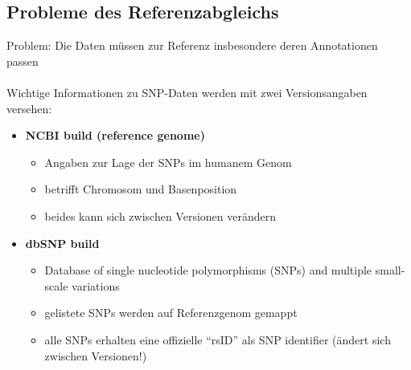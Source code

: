 \subsection{Probleme des Referenzabgleichs}
Problem: Die Daten müssen zur Referenz insbesondere deren Annotationen passen\\\\
Wichtige Informationen zu SNP-Daten werden mit zwei Versionsangaben versehen:
\begin{itemize}
	\item \textbf{NCBI build (reference genome)}
	\begin{itemize}
		\item Angaben zur Lage der SNPs im humanem Genom
		\item betrifft Chromosom und Basenposition
		\item beides kann sich zwischen Versionen verändern
	\end{itemize}
	\item \textbf{dbSNP build}
	\begin{itemize}
		\item Database of single nucleotide polymorphisms (SNPs) and	multiple small-scale variations
		\item gelistete SNPs werden auf Referenzgenom gemappt
		\item alle SNPs erhalten eine offizielle “rsID” als SNP identifier (ändert sich zwischen Versionen!)
	\end{itemize}
\end{itemize}

